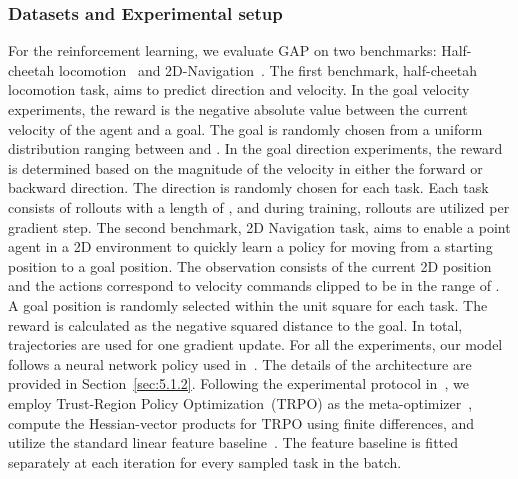 \subsubsection{Datasets and Experimental setup}
For the reinforcement learning, we evaluate GAP on two benchmarks: Half-cheetah locomotion~\cite{todorov2012physics} and 2D-Navigation~\cite{finn2017model}. 
The first benchmark, half-cheetah locomotion task, aims to predict direction and velocity. 
In the goal velocity experiments, the reward is the negative absolute value between the current velocity of the agent and a goal. The goal is randomly chosen from a uniform distribution ranging between  and . 
In the goal direction experiments, the reward is determined based on the magnitude of the velocity in either the forward or backward direction. The direction is randomly chosen for each task. 
Each task consists of rollouts with a length of , and during training,  rollouts are utilized per gradient step. 
The second benchmark, 2D Navigation task, aims to enable a point agent in a 2D environment to quickly learn a policy for moving from a starting position to a goal position. 
The observation consists of the current 2D position and the actions correspond to velocity commands clipped to be in the range of . 
A goal position is randomly selected within the unit square  for each task. 
The reward is calculated as the negative squared distance to the goal. 
In total,  trajectories are used for one gradient update. 
For all the experiments, our model follows a neural network policy used in~\cite{finn2017model}. The details of the architecture are provided in Section~\ref{sec:5.1.2}. 
Following the experimental protocol in~\cite{finn2017model}, we employ Trust-Region Policy Optimization~(TRPO) as the meta-optimizer~\cite{schulman2015trust}, compute the Hessian-vector products for TRPO using finite differences, and utilize the standard linear feature baseline~\cite{duan2016benchmarking}. 
The feature baseline is fitted separately at each iteration for every sampled task in the batch.

